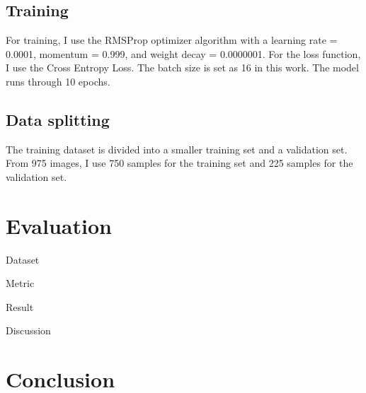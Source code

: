 \documentclass[conference]{IEEEtran}
\begin{document}
\subsection{Training}
For training, I use the RMSProp optimizer algorithm with a learning rate = 0.0001, momentum = 0.999, and weight decay = 0.0000001. For the loss function, I use the Cross Entropy Loss. The batch size is set as 16 in this work. The model runs through 10 epochs.

\subsection{Data splitting}
The training dataset is divided into a smaller training set and a validation set. From 975 images, I use 750 samples for the training set and 225 samples for the validation set.
\section{Evaluation}

Dataset

Metric

Result

Discussion

\section{Conclusion}
\end{document}
